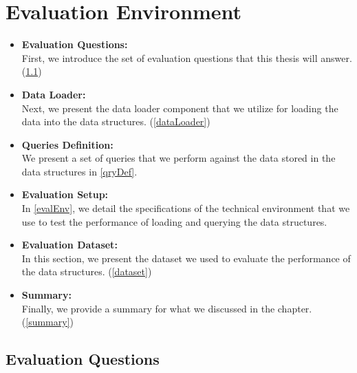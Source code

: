 {\chapter{Evaluation Environment}
\label{chap:EvaluationEnvironment}


\begin{itemize}  
\item \textbf{Evaluation Questions:}\\
First, we introduce the set of evaluation questions that this thesis will answer. (\ref{evalQests})
\item \textbf{Data Loader:}\\
Next, we present the data loader component that we utilize for loading the data into the data structures. (\ref{dataLoader})
\item \textbf{Queries Definition:}\\
We present a set of queries that we perform against the data stored in the data structures in \ref{qryDef}.
\item \textbf{Evaluation Setup:}\\
In \ref{evalEnv}, we detail the specifications of the technical environment that we use to test the performance of loading and querying the data structures. 
\item \textbf{Evaluation Dataset:}\\
In this section, we present the dataset we used to evaluate the performance of the data structures. (\ref{dataset})
\item \textbf{Summary:}\\
Finally, we provide a summary for what we discussed in the chapter. (\ref{summary})
\end{itemize}
 


\section{Evaluation Questions}
\label{evalQests}


}
